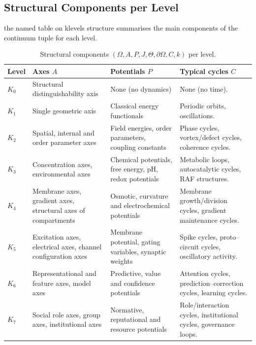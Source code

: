 \subsection{Structural Components per Level}

the named table on klevels structure summarises the main components of the
continuum tuple for each level.

\begin{table}[htbp]
  \centering
  \caption{Structural components \((\Omega, A, P, J, \Theta, \partial\Omega, C, k)\) per level.}
  \label{tab:klevels-structure}
  \begin{tabular}{@{}L{0.08\textwidth}L{0.18\textwidth}L{0.22\textwidth}L{0.42\textwidth}@{}}
    \hline
    Level & Axes \(A\) & Potentials \(P\) & Typical cycles \(C\) \\
    \hline
    \(K_0\) &
      Structural distinguishability axis &
      None (no dynamics) &
      None (no time). \\[0.3em]
    \(K_1\) &
      Single geometric axis & 
      Classical energy functionals &
      Periodic orbits, oscillations. \\[0.3em]
    \(K_2\) &
      Spatial, internal and order parameter axes &
      Field energies, order parameters, coupling constants &
      Phase cycles, vortex/defect cycles, coherence cycles. \\[0.3em]
    \(K_3\) &
      Concentration axes, environmental axes &
      Chemical potentials, free energy, pH, redox potentials &
      Metabolic loops, autocatalytic cycles, RAF structures. \\[0.3em]
    \(K_4\) &
      Membrane axes, gradient axes, structural axes of compartments &
      Osmotic, curvature and electrochemical potentials &
      Membrane growth/division cycles, gradient maintenance cycles. \\[0.3em]
    \(K_5\) &
      Excitation axes, electrical axes, channel configuration axes &
      Membrane potential, gating variables, synaptic weights &
      Spike cycles, proto--circuit cycles, oscillatory activity. \\[0.3em]
    \(K_6\) &
      Representational and feature axes, model axes &
      Predictive, value and confidence potentials &
      Attention cycles, prediction--correction cycles, learning cycles. \\[0.3em]
    \(K_7\) &
      Social role axes, group axes, institutional axes &
      Normative, reputational and resource potentials &
      Role/interaction cycles, institutional cycles, governance loops. \\[0.3em]

\end{tabular}
\end{table}

